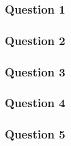 \documentclass[10pt,a4paper]{article}
\begin{document}
\subsubsection{Question 1}

\subsubsection{Question 2}

\subsubsection{Question 3}

\subsubsection{Question 4}

\subsubsection{Question 5}
\end{document}
